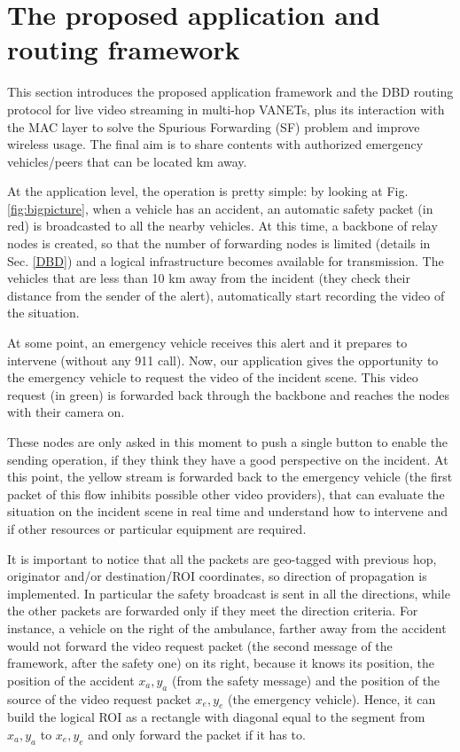 \documentclass{acm_proc_article-sp}
\begin{document}
\section{The proposed application and \\routing framework}
\label{proposal}

This section introduces the proposed application framework and the DBD routing protocol for live video streaming in multi-hop VANETs, plus its interaction with the MAC layer to solve the Spurious Forwarding (SF) problem and improve wireless usage. The final aim is to share contents with authorized emergency vehicles/peers that can be located km away.

At the application level, the operation is pretty simple: by looking at Fig. \ref{fig:bigpicture}, when a vehicle has an accident, an automatic safety packet (in red) is broadcasted to all the nearby vehicles. At this time, a backbone of relay nodes is created, so that the number of forwarding nodes is limited (details in Sec. \ref{DBD}) and a logical infrastructure becomes available for transmission. The vehicles that are less than 10 km away from the incident (they check their distance from the sender of the alert), automatically start recording the video of the situation.

At some point, an emergency vehicle receives this alert and it prepares to intervene (without any 911 call). Now, our application gives the opportunity to the emergency vehicle to request the video of the incident scene. This video request (in green) is forwarded back through the backbone and reaches the nodes with their camera on.

These nodes are only asked in this moment to push a single button to enable the sending operation, if they think they have a good perspective on the incident. At this point, the yellow stream is forwarded back to the emergency vehicle (the first packet of this flow inhibits possible other video providers), that can evaluate the situation on the incident scene in real time and understand how to intervene and if other resources or particular equipment are required.

It is important to notice that all the packets are geo-tagged with previous hop, originator and/or destination/ROI coordinates, so direction of propagation is implemented. In particular the safety broadcast is sent in all the directions, while the other packets are forwarded only if they meet the direction criteria. For instance, a vehicle on the right of the ambulance, farther away from the accident would not forward the video request packet (the second message of the framework, after the safety one) on its right, because it knows its position, the position of the accident $x_{a},y_{a}$ (from the safety message) and the position of the source of the video request packet $x_{e},y_{e}$ (the emergency vehicle). Hence, it can build the logical ROI as a rectangle with diagonal equal to the segment from $x_{a},y_{a}$ to $x_{e},y_{e}$ and only forward the packet if it has to.
\end{document}
